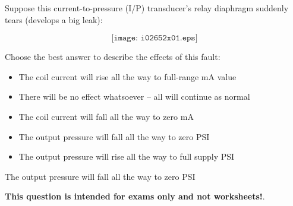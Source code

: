

Suppose this current-to-pressure (I/P) transducer's relay diaphragm suddenly tears (develops a big leak):

$$\texttt{[image: i02652x01.eps]}$$

\noindent
Choose the best answer to describe the effects of this fault:

\begin{itemize}
\item{} The coil current will rise all the way to full-range mA value
\vskip 10pt
\item{} There will be no effect whatsoever -- all will continue as normal
\vskip 10pt
\item{} The coil current will fall all the way to zero mA 
\vskip 10pt
\item{} The output pressure will fall all the way to zero PSI
\vskip 10pt
\item{} The output pressure will rise all the way to full supply PSI 
\end{itemize}







The output pressure will fall all the way to zero PSI







{\bf This question is intended for exams only and not worksheets!}.



